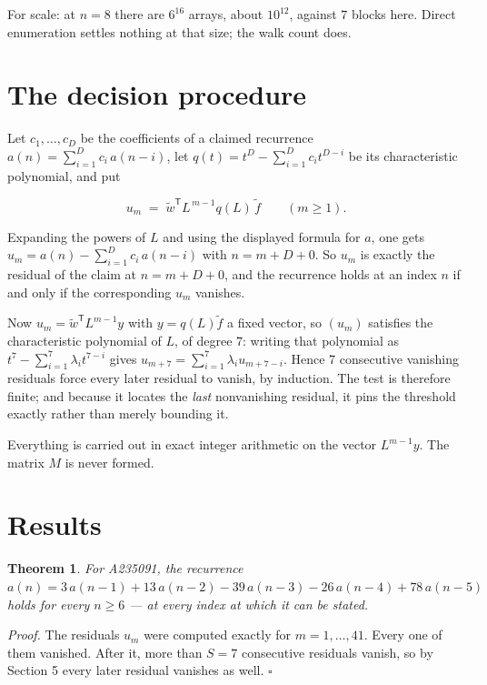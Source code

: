 \documentclass[11pt]{article}
\newtheorem{theorem}{Theorem}
\theoremstyle{definition}
\begin{document}
For scale: at $n = 8$ there are $6^{16}$ arrays, about $10^{12}$, against $7$ blocks here. Direct enumeration settles nothing at that size; the walk count does.

\section{The decision procedure}

Let $c_1,\dots,c_D$ be the coefficients of a claimed recurrence $a(n) = \sum_{i=1}^{D} c_i\,a(n-i)$, let $q(t) = t^{D} - \sum_{i=1}^{D} c_i t^{D-i}$ be its characteristic polynomial, and put

\[u_m \;=\; \tilde w^{\mathsf T} L^{\,m-1} q(L)\,\tilde f \qquad (m \ge 1).\]

Expanding the powers of $L$ and using the displayed formula for $a$, one gets $u_m = a(n) - \sum_{i=1}^{D} c_i\,a(n-i)$ with $n = m + D + 0$. So $u_m$ is exactly the residual of the claim at $n = m + D + 0$, and the recurrence holds at an index $n$ if and only if the corresponding $u_m$ vanishes.

Now $u_m = \tilde w^{\mathsf T} L^{m-1} y$ with $y = q(L)\tilde f$ a fixed vector, so $(u_m)$ satisfies the characteristic polynomial of $L$, of degree $7$: writing that polynomial as $t^{7} - \sum_{i=1}^{7} \lambda_i t^{7-i}$ gives $u_{m+7} = \sum_{i=1}^{7} \lambda_i u_{m+7-i}$. Hence $7$ consecutive vanishing residuals force every later residual to vanish, by induction. The test is therefore finite; and because it locates the {\itshape last} nonvanishing residual, it pins the threshold exactly rather than merely bounding it.

Everything is carried out in exact integer arithmetic on the vector $L^{m-1}y$. The matrix $M$ is never formed.

\section{Results}

\begin{theorem} For A235091, the recurrence $a(n) = 3\,a(n-1) + 13\,a(n-2) - 39\,a(n-3) - 26\,a(n-4) + 78\,a(n-5)$ holds for every $n \ge 6$ --- at every index at which it can be stated.\end{theorem}

{\itshape Proof.} The residuals $u_m$ were computed exactly for $m = 1,\dots,41$. Every one of them vanished. After it, more than $S = 7$ consecutive residuals vanish, so by Section 5 every later residual vanishes as well. $\square$
\end{document}
